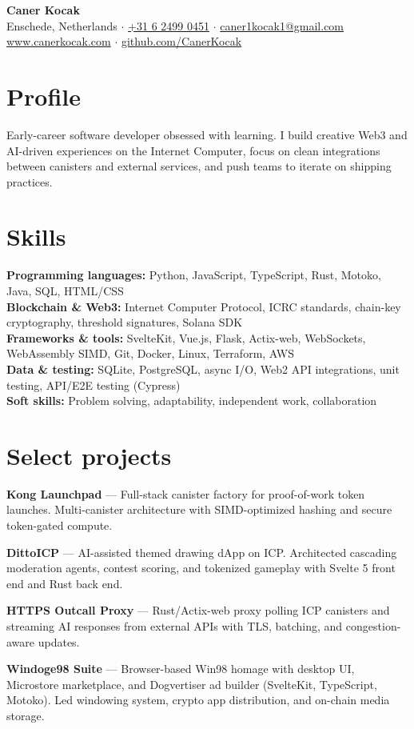 \documentclass[10pt,a4paper]{article}
\begin{document}
\begin{center}
    {\LARGE\bfseries Caner Kocak}\\[4pt]
    Enschede, Netherlands $\cdot$ \href{tel:+31624990451}{+31 6 2499 0451} $\cdot$ \href{mailto:caner1kocak1@gmail.com}{caner1kocak1@gmail.com}\\[2pt]
    \href{https://www.canerkocak.com}{www.canerkocak.com} $\cdot$ \href{https://github.com/CanerKocak}{github.com/CanerKocak}
\end{center}

\section*{Profile}
Early-career software developer obsessed with learning. I build creative Web3 and AI-driven experiences on the Internet Computer, focus on clean integrations between canisters and external services, and push teams to iterate on shipping practices.

\section*{Skills}
\textbf{Programming languages:} Python, JavaScript, TypeScript, Rust, Motoko, Java, SQL, HTML/CSS\\
\textbf{Blockchain \& Web3:} Internet Computer Protocol, ICRC standards, chain-key cryptography, threshold signatures, Solana SDK\\
\textbf{Frameworks \& tools:} SvelteKit, Vue.js, Flask, Actix-web, WebSockets, WebAssembly SIMD, Git, Docker, Linux, Terraform, AWS\\
\textbf{Data \& testing:} SQLite, PostgreSQL, async I/O, Web2 API integrations, unit testing, API/E2E testing (Cypress)\\
\textbf{Soft skills:} Problem solving, adaptability, independent work, collaboration

\section*{Select projects}
\begin{compactitem}[$\bullet$]
    \item \textbf{Kong Launchpad} --- Full-stack canister factory for proof-of-work token launches. Multi-canister architecture with SIMD-optimized hashing and secure token-gated compute.
    \item \textbf{DittoICP} --- AI-assisted themed drawing dApp on ICP. Architected cascading moderation agents, contest scoring, and tokenized gameplay with Svelte 5 front end and Rust back end.
    \item \textbf{HTTPS Outcall Proxy} --- Rust/Actix-web proxy polling ICP canisters and streaming AI responses from external APIs with TLS, batching, and congestion-aware updates.
    \item \textbf{Windoge98 Suite} --- Browser-based Win98 homage with desktop UI, Microstore marketplace, and Dogvertiser ad builder (SvelteKit, TypeScript, Motoko). Led windowing system, crypto app distribution, and on-chain media storage.
\end{compactitem}
\end{document}
